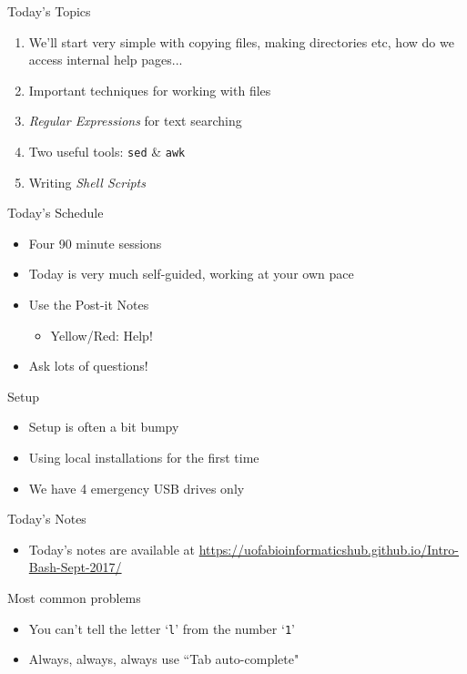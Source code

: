 \documentclass[11pt]{beamer}
\begin{document}
\begin{frame}{Today's Topics}
\begin{enumerate}
	\item We'll start very simple with copying files, making directories etc, how do we access internal help pages...
	\item Important techniques for working with files
	\item \textit{Regular Expressions} for text searching
	\item Two useful tools: \texttt{sed} \& \texttt{awk}
	\item Writing \textit{Shell Scripts}
\end{enumerate}
\end{frame}


\begin{frame}{Today's Schedule}
\begin{itemize}
  \item Four 90 minute sessions
  \item Today is very much self-guided, working at your own pace
  \item Use the Post-it Notes
  \begin{itemize}
	\item Yellow/Red: Help! 
  \end{itemize}
  \item Ask lots of questions!
\end{itemize}
\end{frame}


\begin{frame}{Setup}
\begin{itemize}
	\item Setup is often a bit bumpy
	\item Using local installations for the first time
	\item We have 4 emergency USB drives only
\end{itemize}
\end{frame}


\begin{frame}{Today's Notes}
\begin{itemize}
	\item Today's notes are available at \url{https://uofabioinformaticshub.github.io/Intro-Bash-Sept-2017/}
\end{itemize}
\end{frame}

\begin{frame}{Most common problems}

\begin{itemize}
	\item You can't tell the letter `\texttt{l}' from the number `\texttt{1}'
	\item Always, always, always use ``Tab auto-complete"
\end{itemize}

\end{frame}
\end{document}
